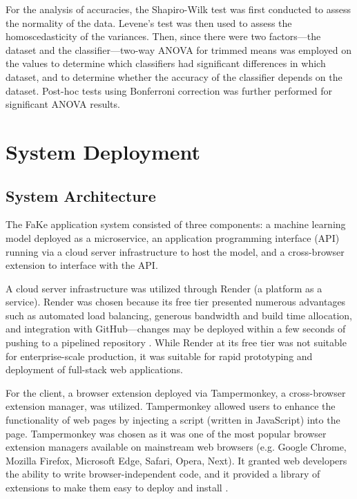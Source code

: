 For the analysis of accuracies, the Shapiro-Wilk test was first conducted to assess the normality of the data. Levene's test was then used to assess the homoscedasticity of the variances. Then, since there were two factors—the dataset and the classifier—two-way ANOVA for trimmed means was employed on the values to determine which classifiers had significant differences in which dataset, and to determine whether the accuracy of the classifier depends on the dataset. Post-hoc tests using Bonferroni correction was further performed for significant ANOVA results. 

\section{System Deployment}

\subsection{System Architecture}

The FaKe application system consisted of three components: a machine learning model deployed as a microservice, an application programming interface (API) running via a cloud server infrastructure to host the model, and a cross-browser extension to interface with the API.

A cloud server infrastructure was utilized through Render (a platform as a service). Render was chosen because its free tier presented numerous advantages such as automated load balancing, generous bandwidth and build time allocation, and integration with GitHub—changes may be deployed within a few seconds of pushing to a pipelined repository \cite{render-docs}. While Render at its free tier was not suitable for enterprise-scale production, it was suitable for rapid prototyping and deployment of full-stack web applications.

For the client, a browser extension deployed via Tampermonkey, a cross-browser extension manager, was utilized. Tampermonkey allowed users to enhance the functionality of web pages by injecting a script (written in JavaScript) into the page. Tampermonkey was chosen as it was one of the most popular browser extension managers available on mainstream web browsers (e.g. Google Chrome, Mozilla Firefox, Microsoft Edge, Safari, Opera, Next). It granted web developers the ability to write browser-independent code, and it provided a library of extensions to make them easy to deploy and install \cite{tampermonkey-website}.

